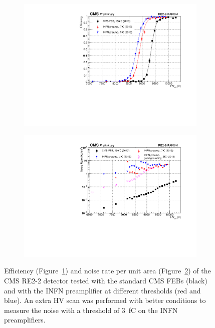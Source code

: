	\begin{figure}[H]
		\begin{subfigure}{.5\linewidth}
		    \centering
			\includegraphics[width=\linewidth]{fig/chapt6/INFN-Preamplifier-Shift.pdf}
			\caption{\label{fig:INFN-preamp:A}}
		\end{subfigure}
		\begin{subfigure}{.5\linewidth}
		    \centering
			\includegraphics[width = \linewidth]{fig/chapt6/INFN-Preamplifier-Rate-Shift.pdf}
			\caption{\label{fig:INFN-preamp:B}}
		\end{subfigure}
		\caption{\label{fig:INFN-preamp} Efficiency (Figure~\ref{fig:INFN-preamp:A}) and noise rate per unit area (Figure~\ref{fig:INFN-preamp:B}) of the CMS RE2-2 detector tested with the standard CMS FEBs (black) and with the INFN preamplifier at different thresholds (red and blue). An extra HV scan was performed with better conditions to measure the noise with a threshold of \SI{3}{fC} on the INFN preamplifiers.}
	\end{figure}
	
